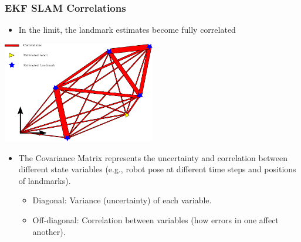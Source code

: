 \begin{frame}
    \frametitle{EKF SLAM Correlations}

    \begin{itemize}
        \item In the limit, the landmark estimates become fully correlated
    \end{itemize}

    \begin{center}
        \includegraphics[width=0.5\textwidth]{../images/ekf_slam/ekf_slam_correlations.pdf}
    \end{center}

    \begin{itemize}
        \item The Covariance Matrix represents the uncertainty and correlation between different state variables (e.g., robot pose at different time steps and positions of landmarks).
        \begin{itemize}
            \item Diagonal: Variance (uncertainty) of each variable.
            \item Off-diagonal: Correlation between variables (how errors in one affect another).
        \end{itemize}
    \end{itemize}
    
\end{frame}

